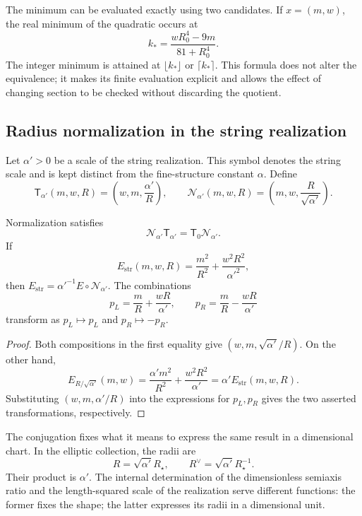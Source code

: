 The minimum can be evaluated exactly using two
candidates. If \(x=(m,w)\), the real minimum of the quadratic
occurs at
\[
 k_* =\frac{wR_0^4-9m}{81+R_0^4}.
\]
The integer minimum is attained at \(\lfloor k_*\rfloor\) or
\(\lceil k_*\rceil\). This formula does not alter the equivalence;
it makes its finite evaluation explicit and allows the effect
of changing section to be checked without discarding the quotient.

\subsection{Radius normalization in the string realization}

Let \(\alpha'>0\) be a scale of the string realization.
This symbol denotes the string scale and is kept distinct
from the fine-structure constant \(\alpha\). Define
\begin{equation}
 \mathsf T_{\alpha'}(m,w,R)
 =\left(w,m,\frac{\alpha'}R\right),\qquad
 \mathcal N_{\alpha'}(m,w,R)
 =\left(m,w,\frac R{\sqrt{\alpha'}}\right).
 \label{iv:eq:normalizacion-cuerda}
\end{equation}

\begin{theorem}
\label{iv:thm:normalizacion-cuerda}
Normalization satisfies
\[
 \mathcal N_{\alpha'}\mathsf T_{\alpha'}
 =\mathsf T_0\mathcal N_{\alpha'}.
\]
If
\[
 E_{\mathrm{str}}(m,w,R)
 =\frac{m^2}{R^2}+\frac{w^2R^2}{\alpha'^2},
\]
then
\(E_{\mathrm{str}}=\alpha'^{-1}E\circ\mathcal N_{\alpha'}\).
The combinations
\[
 p_L=\frac mR+\frac{wR}{\alpha'},\qquad
 p_R=\frac mR-\frac{wR}{\alpha'}
\]
transform as \(p_L\mapsto p_L\) and \(p_R\mapsto-p_R\).
\end{theorem}
\begin{proof}
Both compositions in the first equality give
\((w,m,\sqrt{\alpha'}/R)\). On the other hand,
\[
 E_{R/\sqrt{\alpha'}}(m,w)
 =\frac{\alpha'm^2}{R^2}+\frac{w^2R^2}{\alpha'}
 =\alpha'E_{\mathrm{str}}(m,w,R).
\]
Substituting \((w,m,\alpha'/R)\) into the expressions for
\(p_L,p_R\) gives the two asserted transformations,
respectively.
\end{proof}

The conjugation fixes what it means to express the same result in
a dimensional chart. In the elliptic collection, the radii are
\[
 R=\sqrt{\alpha'}R_\star,\qquad
 R^\vee=\sqrt{\alpha'}R_\star^{-1}.
\]
Their product is \(\alpha'\). The internal determination of the
dimensionless semiaxis ratio and the length-squared scale of the
realization serve different functions: the former fixes the shape;
the latter expresses its radii in a dimensional unit.

